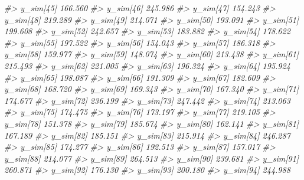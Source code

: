 \documentclass[
  10pt,
  italian,
  a4paper,
  extrafontsizes,onecolumn,openright
  ]{memoir}
\newenvironment{Shaded}{\begin{snugshade}}{\end{snugshade}}
\newcommand{\CommentTok}[1]{\textcolor[rgb]{0.56,0.35,0.01}{\textit{#1}}}
\begin{document}
\begin{Shaded}
\begin{Highlighting}[]
\CommentTok{\#\textgreater{}   y\_sim[45]  166.560}
\CommentTok{\#\textgreater{}   y\_sim[46]  245.986}
\CommentTok{\#\textgreater{}   y\_sim[47]  154.243}
\CommentTok{\#\textgreater{}   y\_sim[48]  219.289}
\CommentTok{\#\textgreater{}   y\_sim[49]  214.071}
\CommentTok{\#\textgreater{}   y\_sim[50]  193.091}
\CommentTok{\#\textgreater{}   y\_sim[51]  199.608}
\CommentTok{\#\textgreater{}   y\_sim[52]  242.657}
\CommentTok{\#\textgreater{}   y\_sim[53]  183.882}
\CommentTok{\#\textgreater{}   y\_sim[54]  178.622}
\CommentTok{\#\textgreater{}   y\_sim[55]  197.522}
\CommentTok{\#\textgreater{}   y\_sim[56]  154.043}
\CommentTok{\#\textgreater{}   y\_sim[57]  186.318}
\CommentTok{\#\textgreater{}   y\_sim[58]  159.977}
\CommentTok{\#\textgreater{}   y\_sim[59]  148.074}
\CommentTok{\#\textgreater{}   y\_sim[60]  213.438}
\CommentTok{\#\textgreater{}   y\_sim[61]  215.493}
\CommentTok{\#\textgreater{}   y\_sim[62]  221.005}
\CommentTok{\#\textgreater{}   y\_sim[63]  196.324}
\CommentTok{\#\textgreater{}   y\_sim[64]  195.924}
\CommentTok{\#\textgreater{}   y\_sim[65]  198.087}
\CommentTok{\#\textgreater{}   y\_sim[66]  191.309}
\CommentTok{\#\textgreater{}   y\_sim[67]  182.609}
\CommentTok{\#\textgreater{}   y\_sim[68]  168.720}
\CommentTok{\#\textgreater{}   y\_sim[69]  169.343}
\CommentTok{\#\textgreater{}   y\_sim[70]  167.340}
\CommentTok{\#\textgreater{}   y\_sim[71]  174.677}
\CommentTok{\#\textgreater{}   y\_sim[72]  236.199}
\CommentTok{\#\textgreater{}   y\_sim[73]  247.442}
\CommentTok{\#\textgreater{}   y\_sim[74]  213.063}
\CommentTok{\#\textgreater{}   y\_sim[75]  174.475}
\CommentTok{\#\textgreater{}   y\_sim[76]  173.197}
\CommentTok{\#\textgreater{}   y\_sim[77]  219.105}
\CommentTok{\#\textgreater{}   y\_sim[78]  151.378}
\CommentTok{\#\textgreater{}   y\_sim[79]  185.674}
\CommentTok{\#\textgreater{}   y\_sim[80]  162.141}
\CommentTok{\#\textgreater{}   y\_sim[81]  167.189}
\CommentTok{\#\textgreater{}   y\_sim[82]  185.151}
\CommentTok{\#\textgreater{}   y\_sim[83]  215.914}
\CommentTok{\#\textgreater{}   y\_sim[84]  246.287}
\CommentTok{\#\textgreater{}   y\_sim[85]  174.277}
\CommentTok{\#\textgreater{}   y\_sim[86]  192.513}
\CommentTok{\#\textgreater{}   y\_sim[87]  157.017}
\CommentTok{\#\textgreater{}   y\_sim[88]  214.077}
\CommentTok{\#\textgreater{}   y\_sim[89]  264.513}
\CommentTok{\#\textgreater{}   y\_sim[90]  239.681}
\CommentTok{\#\textgreater{}   y\_sim[91]  260.871}
\CommentTok{\#\textgreater{}   y\_sim[92]  176.130}
\CommentTok{\#\textgreater{}   y\_sim[93]  200.180}
\CommentTok{\#\textgreater{}   y\_sim[94]  244.988}

\end{Highlighting}
\end{Shaded}
\end{document}
